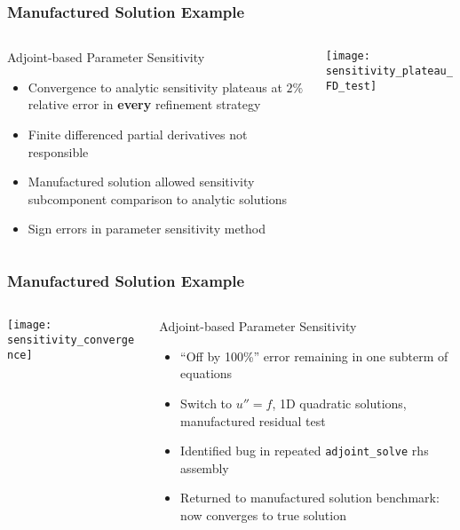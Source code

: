 \begin{frame}
\frametitle{Manufactured Solution Example}
\begin{columns}
\begin{column}{.55\textwidth}
\begin{block}{Adjoint-based Parameter Sensitivity}
\begin{itemize}
\item Convergence to analytic sensitivity plateaus at $2\%$ relative
error in {\bf every} refinement strategy
\item Finite differenced partial derivatives not responsible
\item Manufactured solution allowed sensitivity subcomponent
comparison to analytic solutions
\item Sign errors in \libMesh{} parameter sensitivity method
\end{itemize}
\end{block}
\end{column}
\begin{column}{.45\textwidth}
\texttt{[image: sensitivity\_plateau\_FD\_test]}
\end{column}
\end{columns}

\end{frame}

\begin{frame}
\frametitle{Manufactured Solution Example}
\begin{columns}
\begin{column}{.45\textwidth}
\texttt{[image: sensitivity\_convergence]}
\end{column}
\begin{column}{.55\textwidth}
\begin{block}{Adjoint-based Parameter Sensitivity}
\begin{itemize}
\item ``Off by 100\%'' error remaining in one subterm of equations
\item Switch to $u''=f$, 1D quadratic solutions, manufactured residual test
\item Identified bug in repeated \texttt{adjoint\_solve} rhs assembly
\item Returned to manufactured solution benchmark: now converges to
true solution
\end{itemize}
\end{block}
\end{column}
\end{columns}

\end{frame}

